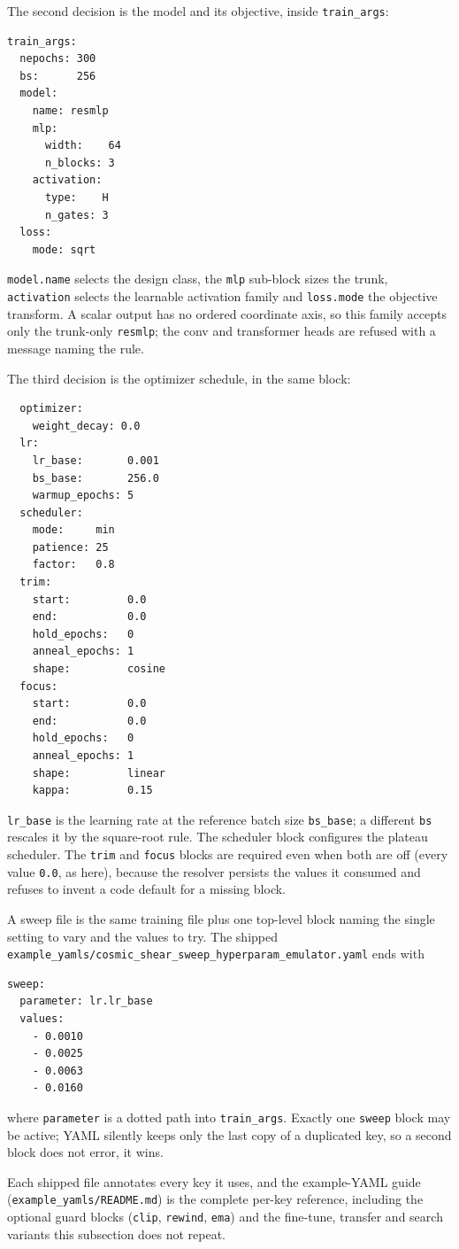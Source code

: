 \documentclass[10pt,aps,prd,twocolumn,nofootinbib]{revtex4-2}
\newcommand{\code}[1]{\texttt{#1}}
\begin{document}
The second decision is the model and its objective, inside
\code{train\_args}:
\begin{verbatim}
train_args:
  nepochs: 300
  bs:      256
  model:
    name: resmlp
    mlp:
      width:    64
      n_blocks: 3
    activation:
      type:    H
      n_gates: 3
  loss:
    mode: sqrt
\end{verbatim}
\code{model.name} selects the design class, the \code{mlp} sub-block sizes
the trunk, \code{activation} selects the learnable activation family and
\code{loss.mode} the objective transform.  A scalar output has no ordered
coordinate axis, so this family accepts only the trunk-only \code{resmlp};
the conv and transformer heads are refused with a message naming the rule.

The third decision is the optimizer schedule, in the same block:
\begin{verbatim}
  optimizer:
    weight_decay: 0.0
  lr:
    lr_base:       0.001
    bs_base:       256.0
    warmup_epochs: 5
  scheduler:
    mode:     min
    patience: 25
    factor:   0.8
  trim:
    start:         0.0
    end:           0.0
    hold_epochs:   0
    anneal_epochs: 1
    shape:         cosine
  focus:
    start:         0.0
    end:           0.0
    hold_epochs:   0
    anneal_epochs: 1
    shape:         linear
    kappa:         0.15
\end{verbatim}
\code{lr\_base} is the learning rate at the reference batch size
\code{bs\_base}; a different \code{bs} rescales it by the square-root rule.
The scheduler block configures the plateau scheduler.  The \code{trim} and
\code{focus} blocks are required even when both are off (every value
\code{0.0}, as here), because the resolver persists the values it consumed
and refuses to invent a code default for a missing block.

A sweep file is the same training file plus one top-level block naming the
single setting to vary and the values to try.  The shipped
\code{example\_yamls/cosmic\_shear\_sweep\_hyperparam\_emulator.yaml} ends
with
\begin{verbatim}
sweep:
  parameter: lr.lr_base
  values:
    - 0.0010
    - 0.0025
    - 0.0063
    - 0.0160
\end{verbatim}
where \code{parameter} is a dotted path into \code{train\_args}.  Exactly one
\code{sweep} block may be active; YAML silently keeps only the last copy of a
duplicated key, so a second block does not error, it wins.

Each shipped file annotates every key it uses, and the example-YAML guide
(\code{example\_yamls/README.md}) is the complete per-key reference,
including the optional guard blocks (\code{clip}, \code{rewind},
\code{ema}) and the fine-tune, transfer and search variants this
subsection does not repeat.
\end{document}
